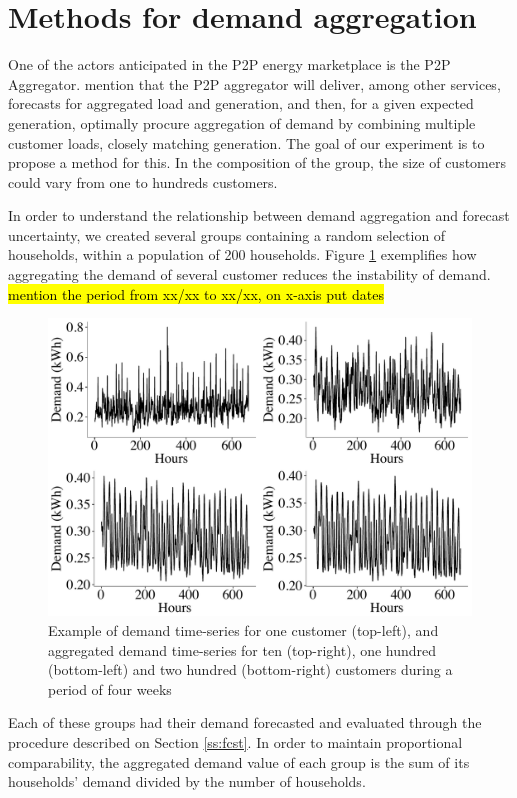 \documentclass[review, 3p, 12pt, authoryear]{elsarticle}
\begin{document}
\section{Methods for demand aggregation}
\label{sec:load_aggr}
One of the  actors anticipated in the P2P energy marketplace is the P2P Aggregator. \citet{pouttu2017p2p} mention that the P2P aggregator will deliver, among other services, forecasts for aggregated load and generation, and then, for a given expected generation, optimally procure aggregation of demand by combining multiple customer loads, closely matching generation. The goal of our experiment is to propose a method for this. In the composition of the group, the size of customers could vary from one to hundreds customers.

In order to understand the relationship between demand aggregation and forecast uncertainty, we created several groups containing a random selection of households, within a population of 200 households.
Figure \ref{fig:4weeksaggr} exemplifies how aggregating the demand of several customer reduces the instability of demand.
\hl{mention the period from xx/xx to xx/xx, on x-axis put dates}

\begin{figure}
  \centering
  \includegraphics[width=0.8\columnwidth]{2017-10-13_compare_aggrdemands}
  \caption{Example of demand time-series for one customer (top-left), and aggregated demand time-series for ten (top-right), one hundred (bottom-left) and two hundred (bottom-right) customers during a period of four weeks}
  \label{fig:4weeksaggr}
\end{figure}

Each of these groups had their demand forecasted and evaluated through the procedure described on Section \ref{ss:fcst}.
In order to maintain proportional comparability, the aggregated demand value of each group is the sum of its households' demand divided by the number of households.
\end{document}
